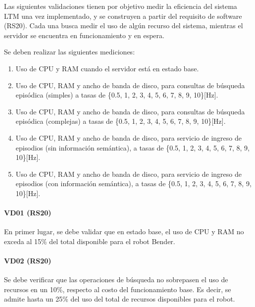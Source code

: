 

Las siguientes validaciones tienen por objetivo medir la eficiencia del sistema LTM una vez implementado, y se construyen a partir del requisito de software (RS20). Cada una busca medir el uso de algún recurso del sistema, mientras el servidor se encuentra en funcionamiento y en espera. 

Se deben realizar las siguientes mediciones:
\begin{enumerate}
\item Uso de CPU y RAM cuando el servidor está en estado base.
\item Uso de CPU, RAM y ancho de banda de disco, para consultas de búsqueda episódica (simples) a tasas de \{0.5, 1, 2, 3, 4, 5, 6, 7, 8, 9, 10\}[Hz].
\item Uso de CPU, RAM y ancho de banda de disco, para consultas de búsqueda episódica (complejas) a tasas de \{0.5, 1, 2, 3, 4, 5, 6, 7, 8, 9, 10\}[Hz].
\item Uso de CPU, RAM y ancho de banda de disco, para servicio de ingreso de episodios (sin información semántica), a tasas de \{0.5, 1, 2, 3, 4, 5, 6, 7, 8, 9, 10\}[Hz].
\item Uso de CPU, RAM y ancho de banda de disco, para servicio de ingreso de episodios (con información semántica), a tasas de \{0.5, 1, 2, 3, 4, 5, 6, 7, 8, 9, 10\}[Hz].
\end{enumerate}

\paragraph{VD01 (RS20)}
En primer lugar, se debe validar que en estado base, el uso de CPU y RAM no exceda al 15\% del total disponible para el robot Bender.

\paragraph{VD02 (RS20)}
Se debe verificar que las operaciones de búsqueda no sobrepasen el uso de recursos en un 10\%, respecto al costo del funcionamiento base. Es decir, se admite hasta un 25\% del uso del total de recursos disponibles para el robot.

